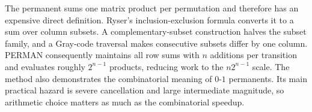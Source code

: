 \documentclass[10pt,letterpaper]{article}
\begin{document}
\begin{tcolorbox}[colback=Ink!4,colframe=Ink,title=Cornell summary]
The permanent sums one matrix product per permutation and therefore has an expensive direct definition. Ryser's inclusion-exclusion formula converts it to a sum over column subsets. A complementary-subset construction halves the subset family, and a Gray-code traversal makes consecutive subsets differ by one column. PERMAN consequently maintains all row sums with $n$ additions per transition and evaluates roughly $2^{n-1}$ products, reducing work to the $n2^{n-1}$ scale. The method also demonstrates the combinatorial meaning of $0$-$1$ permanents. Its main practical hazard is severe cancellation and large intermediate magnitude, so arithmetic choice matters as much as the combinatorial speedup.
\end{tcolorbox}
\end{document}
